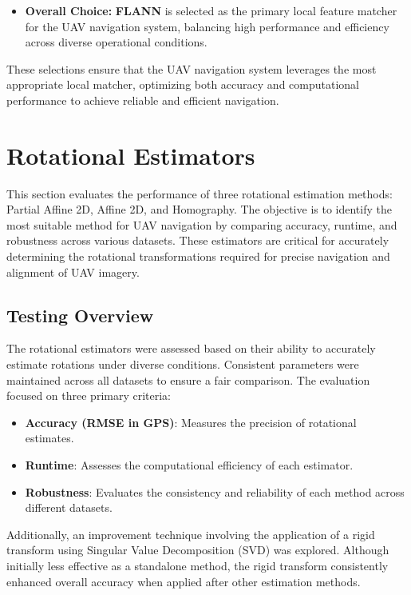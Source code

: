 \begin{itemize}
    \item \textbf{Overall Choice:} \textbf{FLANN} is selected as the primary local feature matcher for the UAV navigation system, balancing high performance and efficiency across diverse operational conditions.
\end{itemize}

These selections ensure that the UAV navigation system leverages the most appropriate local matcher, optimizing both accuracy and computational performance to achieve reliable and efficient navigation.


\section{Rotational Estimators}

This section evaluates the performance of three rotational estimation methods: Partial Affine 2D, Affine 2D, and Homography. The objective is to identify the most suitable method for UAV navigation by comparing accuracy, runtime, and robustness across various datasets. These estimators are critical for accurately determining the rotational transformations required for precise navigation and alignment of UAV imagery.

\subsection{Testing Overview}

The rotational estimators were assessed based on their ability to accurately estimate rotations under diverse conditions. Consistent parameters were maintained across all datasets to ensure a fair comparison. The evaluation focused on three primary criteria:
\begin{itemize}
    \item \textbf{Accuracy (RMSE in GPS)}: Measures the precision of rotational estimates.
    \item \textbf{Runtime}: Assesses the computational efficiency of each estimator.
    \item \textbf{Robustness}: Evaluates the consistency and reliability of each method across different datasets.
\end{itemize}

Additionally, an improvement technique involving the application of a rigid transform using Singular Value Decomposition (SVD) was explored. Although initially less effective as a standalone method, the rigid transform consistently enhanced overall accuracy when applied after other estimation methods.

